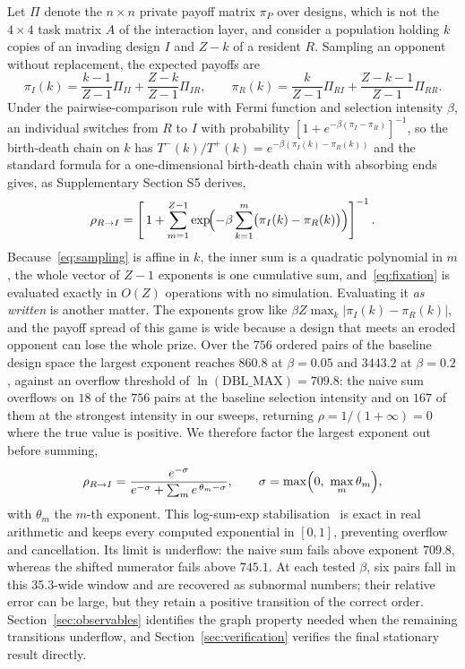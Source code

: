 \documentclass[a4paper,fleqn]{cas-sc}
\newcommand{\piP}{\pi_{P}}
\begin{document}
Let $\Pi$ denote the $n\times n$ private payoff matrix $\piP$ over designs,
which is not the $4\times4$ task matrix $A$ of the interaction layer, and
consider a population holding $k$ copies of an invading design $I$ and $Z-k$ of
a resident $R$. Sampling an opponent without replacement, the expected payoffs
are
\begin{equation}
  \pi_{I}(k) = \frac{k-1}{Z-1}\Pi_{II} + \frac{Z-k}{Z-1}\Pi_{IR},
  \qquad
  \pi_{R}(k) = \frac{k}{Z-1}\Pi_{RI} + \frac{Z-k-1}{Z-1}\Pi_{RR}.
  \label{eq:sampling}
\end{equation}
Under the pairwise-comparison rule with Fermi function and selection intensity
$\beta$, an individual switches from $R$ to $I$ with probability
$[1+e^{-\beta(\pi_{I}-\pi_{R})}]^{-1}$, so the birth-death chain on $k$ has
$T^{-}(k)/T^{+}(k)=e^{-\beta(\pi_{I}(k)-\pi_{R}(k))}$ and the standard formula
for a one-dimensional birth-death chain with absorbing ends gives, as
Supplementary Section S5 derives,
\begin{equation}
  \rho_{R\to I} = \left[\,1+\sum_{m=1}^{Z-1}
    \exp\!\Bigl(-\beta\sum_{k=1}^{m}\bigl(\pi_{I}(k)-\pi_{R}(k)\bigr)\Bigr)
  \right]^{-1}.
  \label{eq:fixation}
\end{equation}
Because~\eqref{eq:sampling} is affine in $k$, the inner sum is a quadratic
polynomial in $m$, the whole vector of $Z-1$ exponents is one cumulative sum,
and~\eqref{eq:fixation} is evaluated exactly in $O(Z)$ operations with no
simulation. Evaluating it \emph{as written} is another matter. The exponents
grow like $\beta Z\max_{k}|\pi_{I}(k)-\pi_{R}(k)|$, and the payoff spread of
this game is wide because a design that meets an eroded opponent can lose the
whole prize. Over the $756$ ordered pairs of the baseline design space the
largest exponent reaches $860.8$ at $\beta=0.05$ and $3443.2$ at $\beta=0.2$,
against an overflow threshold of $\ln(\mathrm{DBL\_MAX})=709.8$: the naive sum
overflows on $18$ of the $756$ pairs at the baseline selection intensity and on
$167$ of them at the strongest intensity in our sweeps, returning
$\rho=1/(1+\infty)=0$ where the true value is positive. We therefore factor the
largest exponent out before summing,
\begin{equation}
  \rho_{R\to I} = \frac{e^{-\sigma}}{e^{-\sigma}+\sum_{m}e^{\,\theta_{m}-\sigma}},
  \qquad
  \sigma = \max\Bigl(0,\ \max_{m}\theta_{m}\Bigr),
  \label{eq:shift}
\end{equation}
with $\theta_m$ the $m$-th exponent. This log-sum-exp
stabilisation~\citep{blanchard2021logsumexp} is exact in real arithmetic and
keeps every computed exponential in $[0,1]$, preventing overflow and
cancellation. Its limit is underflow: the naive sum fails above exponent
$709.8$, whereas the shifted numerator fails above $745.1$. At each tested
$\beta$, six pairs fall in this 35.3-wide window and are recovered as subnormal
numbers; their relative error can be large, but they retain a positive
transition of the correct order. Section~\ref{sec:observables} identifies the
graph property needed when the remaining transitions underflow, and
Section~\ref{sec:verification} verifies the final stationary result directly.
\end{document}
